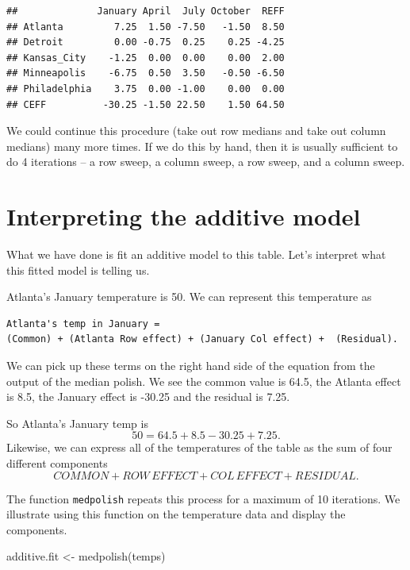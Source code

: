 \documentclass[
]{book}
\newenvironment{Shaded}{\begin{snugshade}}{\end{snugshade}}
\newcommand{\FunctionTok}[1]{\textcolor[rgb]{0.00,0.00,0.00}{#1}}
\newcommand{\NormalTok}[1]{#1}
\newcommand{\OtherTok}[1]{\textcolor[rgb]{0.56,0.35,0.01}{#1}}
\begin{document}
\begin{verbatim}
##              January April  July October  REFF
## Atlanta         7.25  1.50 -7.50   -1.50  8.50
## Detroit         0.00 -0.75  0.25    0.25 -4.25
## Kansas_City    -1.25  0.00  0.00    0.00  2.00
## Minneapolis    -6.75  0.50  3.50   -0.50 -6.50
## Philadelphia    3.75  0.00 -1.00    0.00  0.00
## CEFF          -30.25 -1.50 22.50    1.50 64.50
\end{verbatim}

We could continue this procedure (take out row medians and take out column medians) many more times. If we do this by hand, then it is usually sufficient to do 4 iterations -- a row sweep, a column sweep, a row sweep, and a column sweep.

\hypertarget{interpreting-the-additive-model}{%
\section{Interpreting the additive model}\label{interpreting-the-additive-model}}

What we have done is fit an additive model to this table. Let's interpret what this fitted model is telling us.

Atlanta's January temperature is 50. We can represent this temperature as

\begin{verbatim}
Atlanta's temp in January = 
(Common) + (Atlanta Row effect) + (January Col effect) +  (Residual).
\end{verbatim}

We can pick up these terms on the right hand side of the equation from the output of the median polish. We see the common value is 64.5, the Atlanta effect is 8.5, the January effect is -30.25 and the residual is 7.25.

So Atlanta's January temp is
\[
50 = 64.5 + 8.5 - 30.25 + 7.25 .
\]
Likewise, we can express all of the temperatures of the table as the sum of four different components
\[
COMMON + ROW \, EFFECT + COL \, EFFECT + RESIDUAL.
\]

The function \texttt{medpolish} repeats this process for a maximum of 10 iterations. We illustrate using this function on the temperature data and display the components.

\begin{Shaded}
\begin{Highlighting}[]
\NormalTok{additive.fit }\OtherTok{\textless{}{-}} \FunctionTok{medpolish}\NormalTok{(temps)}
\end{Highlighting}
\end{Shaded}
\end{document}
